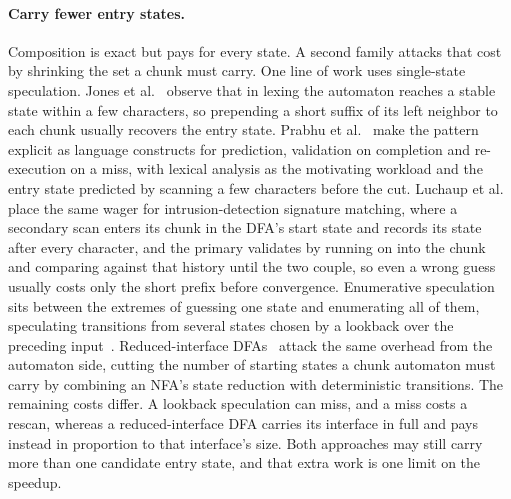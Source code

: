 \documentclass[11pt,a4paper]{article}
\theoremstyle{definition}
\theoremstyle{plain}
\begin{document}
\paragraph{Carry fewer entry states.} Composition is exact but pays for every state. A second family attacks that cost
by shrinking the set a chunk must carry. One line of work uses single-state speculation. Jones et
al.~\cite{jones2009browser} observe that in lexing the automaton reaches a stable state within a few characters, so
prepending a short suffix of its left neighbor to each chunk usually recovers the entry state. Prabhu et
al.~\cite{prabhu2010speculative} make the pattern explicit as language constructs for prediction, validation on
completion and re-execution on a miss, with lexical analysis as the motivating workload and the entry state predicted by
scanning a few characters before the cut. Luchaup et al.~\cite{luchaup2009speculation} place the same wager for
intrusion-detection signature matching, where a secondary scan enters its chunk in the DFA's start state and records its
state after every character, and the primary validates by running on into the chunk and comparing against that history
until the two couple, so even a wrong guess usually costs only the short prefix before convergence. Enumerative
speculation sits between the extremes of guessing one state and enumerating all of them, speculating transitions from
several states chosen by a lookback over the preceding input~\cite{jiang2017enumerative}. Reduced-interface
DFAs~\cite{borsotti2025ridfa} attack the same overhead from the automaton side, cutting the number of starting states a
chunk automaton must carry by combining an NFA's state reduction with deterministic transitions. The remaining costs
differ. A lookback speculation can miss, and a miss costs a rescan, whereas a reduced-interface DFA carries its
interface in full and pays instead in proportion to that interface's size. Both approaches may still carry more than one
candidate entry state, and that extra work is one limit on the speedup.
\end{document}
